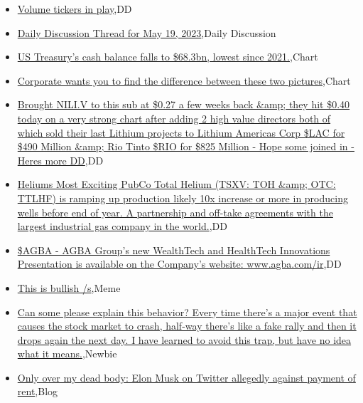 \documentclass{article}%
\begin{document}
%
\begin{itemize}%
\item%
\href{https://reddit.com/r/wallstreetbets/comments/13lt6y7/volume\_tickers\_in\_play/}{Volume tickers in play},DD%
\item%
\href{https://reddit.com/r/wallstreetbets/comments/13lr0qm/daily\_discussion\_thread\_for\_may\_19\_2023/}{Daily Discussion Thread for May 19, 2023},Daily Discussion%
\item%
\href{https://reddit.com/r/wallstreetbets/comments/13lq58q/us\_treasurys\_cash\_balance\_falls\_to\_683bn\_lowest/}{US Treasury's cash balance falls to \$68.3bn, lowest since 2021.},Chart%
\item%
\href{https://reddit.com/r/wallstreetbets/comments/13lp016/corporate\_wants\_you\_to\_find\_the\_difference/}{Corporate wants you to find the difference between these two pictures},Chart%
\item%
\href{https://reddit.com/r/Baystreetbets/comments/13lercf/brought\_niliv\_to\_this\_sub\_at\_027\_a\_few\_weeks\_back/}{Brought NILI.V to this sub at \$0.27 a few weeks back \&amp; they hit \$0.40 today on a very strong chart after adding 2 high value directors both of which sold their last Lithium projects to Lithium Americas Corp \$LAC for \$490 Million \&amp; Rio Tinto \$RIO for \$825 Million - Hope some joined in - Heres more DD},DD%
\item%
\href{https://reddit.com/r/Baystreetbets/comments/13l251v/heliums\_most\_exciting\_pubco\_total\_helium\_tsxv\_toh/}{Heliums Most Exciting PubCo Total Helium (TSXV: TOH \&amp; OTC: TTLHF) is ramping up production  likely 10x increase or more in producing wells before end of year. A partnership and off-take agreements with the largest industrial gas company in the world.},DD%
\item%
\href{https://reddit.com/r/Baystreetbets/comments/13kzopm/agba\_agba\_groups\_new\_wealthtech\_and\_healthtech/}{\$AGBA - AGBA Group's new WealthTech and HealthTech Innovations Presentation is available on the Company's website: www.agba.com/ir},DD%
\item%
\href{https://reddit.com/r/StockMarket/comments/13lokbk/this\_is\_bullish\_s/}{This is bullish /s},Meme%
\item%
\href{https://reddit.com/r/StockMarket/comments/13lnb96/can\_some\_please\_explain\_this\_behavior\_every\_time/}{Can some please explain this behavior? Every time there's a major event that causes the stock market to crash, half-way there's like a fake rally and then it drops again the next day. I have learned to avoid this trap, but have no idea what it means.},Newbie%
\item%
\href{https://reddit.com/r/Economics/comments/13lp1bd/only\_over\_my\_dead\_body\_elon\_musk\_on\_twitter/}{Only over my dead body: Elon Musk on Twitter allegedly against payment of rent},Blog%
\end{itemize}%
\end{document}
